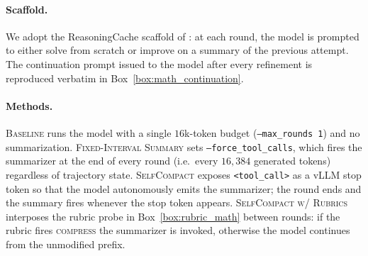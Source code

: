 \documentclass{article}
\newcommand{\method}{\textsc{{SelfCompact}}}
\begin{document}
\paragraph{Scaffold.} We adopt the ReasoningCache scaffold of
\citet{wu2026reasoningcachecontinualimprovement}: at each round, the
model is prompted to either solve from scratch or improve on a summary
of the previous attempt. The continuation prompt issued to the model
after every refinement is reproduced verbatim in Box~\ref{box:math_continuation}.

\paragraph{Methods.}
\textsc{Baseline} runs the model with a single $16$k-token budget
(\texttt{--max\_rounds 1}) and no summarization.
\textsc{Fixed-Interval Summary} sets \texttt{--force\_tool\_calls},
which fires the summarizer at the end of every round (i.e.\ every
$16{,}384$ generated tokens) regardless of trajectory state.
\textsc{\method{}} exposes \texttt{<tool\_call>} as a vLLM stop token so
that the model autonomously emits the summarizer; the round ends and the
summary fires whenever the stop token appears.
\textsc{\method{} w/ Rubrics} interposes the rubric probe in
Box~\ref{box:rubric_math} between rounds: if the rubric fires
\textsc{compress} the summarizer is invoked, otherwise the model
continues from the unmodified prefix.
\end{document}
